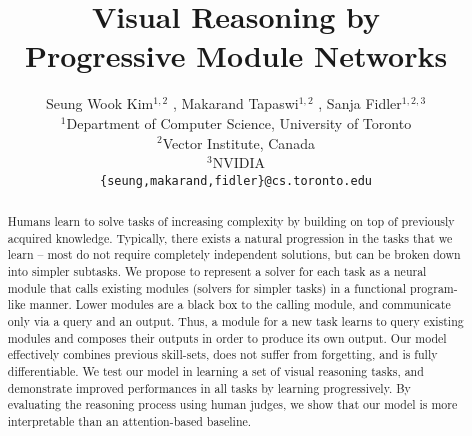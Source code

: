 \documentclass{article}
\title{Visual Reasoning by \\ Progressive Module Networks}
\author{
  Seung Wook Kim$^{1,2}$ , Makarand Tapaswi$^{1,2}$ , Sanja Fidler$^{1,2,3}$  \\
  $^1$Department of Computer Science, University of Toronto\\
  $^2$Vector Institute, Canada\\
  $^3$NVIDIA\\
  \texttt{\{seung,makarand,fidler\}@cs.toronto.edu} \\
}
\begin{document}
\maketitle
\vspace{-1.5mm}
\begin{abstract}
Humans learn to solve tasks of increasing complexity by building on top of previously acquired knowledge. %
Typically, there exists a natural progression in the tasks that we learn -- most do not require completely independent solutions, but can be broken down into simpler subtasks.
We propose to represent a solver for each task as a neural module that calls existing modules (solvers for simpler tasks) in a functional program-like manner.
Lower modules are a black box to the calling module, and communicate only via a query and an output.
Thus, a module for a new task learns to query existing modules and composes their outputs in order to produce its own output.
Our model effectively combines previous skill-sets, does not suffer from forgetting, and is fully differentiable.
We test our model in learning a set of visual reasoning tasks, and demonstrate improved performances in all tasks by learning progressively. %
By evaluating the reasoning process using human judges, we show that our model is more interpretable than an attention-based baseline.


\end{abstract}
\end{document}
